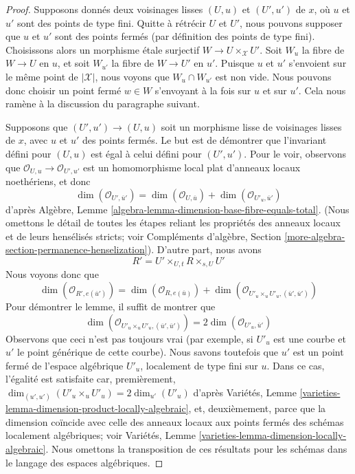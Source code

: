\begin{proof}
Supposons donnés deux voisinages lisses $(U, u)$ et $(U', u')$
de $x$, où $u$ et $u'$ sont des points de type fini. Quitte à rétrécir $U$
et $U'$, nous pouvons supposer que $u$ et $u'$ sont des points fermés
(par définition des points de type fini). Choisissons alors
un morphisme étale surjectif $W \to U \times_\mathcal{X} U'$.
Soit $W_u$ la fibre de $W \to U$ en $u$, et
soit $W_{u'}$ la fibre de $W \to U'$ en $u'$.
Puisque $u$ et $u'$ s'envoient sur le même point de $|\mathcal{X}|$,
nous voyons que $W_u \cap W_{u'}$ est non vide.
Nous pouvons donc choisir un point fermé $w \in W$ s'envoyant à la fois
sur $u$ et sur $u'$. Cela nous ramène à la discussion du
paragraphe suivant.

\medskip\noindent
Supposons que $(U', u') \to (U, u)$ soit un morphisme lisse de voisinages
lisses de $x$, avec $u$ et $u'$ des points fermés.
Le but est de démontrer que l'invariant défini pour $(U, u)$ est égal
à celui défini pour $(U', u')$.
Pour le voir, observons que $\mathcal{O}_{U, u} \to \mathcal{O}_{U', u'}$
est un homomorphisme local plat d'anneaux locaux noethériens, et donc
$$
\dim(\mathcal{O}_{U', \overline{u}'}) =
\dim(\mathcal{O}_{U, \overline{u}}) +
\dim(\mathcal{O}_{U'_u, \overline{u}'})
$$
d'après Algèbre, Lemme \ref{algebra-lemma-dimension-base-fibre-equals-total}.
(Nous omettons le détail de toutes les étapes reliant les propriétés des anneaux
locaux et de leurs hensélisés stricts; voir
Compléments d'algèbre, Section \ref{more-algebra-section-permanence-henselization}).
D'autre part, nous avons
$$
R' = U' \times_{U, t} R \times_{s, U} U'
$$
Nous voyons donc que
$$
\dim(\mathcal{O}_{R', e(\overline{u}')}) =
\dim(\mathcal{O}_{R, e(\overline{u})}) +
\dim(\mathcal{O}_{U'_u \times_u U'_u, (\overline{u}', \overline{u}')})
$$
Pour démontrer le lemme, il suffit de montrer que
$$
\dim(\mathcal{O}_{U'_u \times_u U'_u, (\overline{u}', \overline{u}')}) =
2\dim(\mathcal{O}_{U'_u, \overline{u}'})
$$
Observons que ceci n'est pas toujours vrai (par exemple, si $U'_u$ est une courbe
et $u'$ le point générique de cette courbe). Nous savons toutefois
que $u'$ est un point fermé de l'espace algébrique $U'_u$, localement
de type fini sur $u$. Dans ce cas, l'égalité est satisfaite car, premièrement,
$\dim_{(u', u')}(U'_u \times_u U'_u) = 2\dim_{u'}(U'_u)$ d'après
Variétés, Lemme \ref{varieties-lemma-dimension-product-locally-algebraic},
et, deuxièmement, parce que la dimension coïncide avec celle des anneaux locaux
aux points fermés des schémas localement algébriques; voir
Variétés, Lemme \ref{varieties-lemma-dimension-locally-algebraic}.
Nous omettons la transposition de ces résultats pour les schémas dans le
langage des espaces algébriques.
\end{proof}

